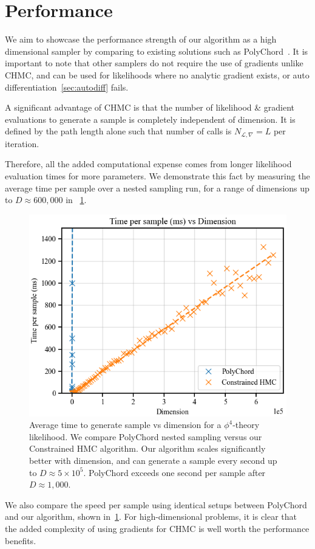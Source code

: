 \documentclass[11pt]{article}
\begin{document}
\section{Performance}\label{sec:performance}
    We aim to showcase the performance strength of our algorithm as a high dimensional sampler by comparing to existing
    solutions such as PolyChord~\cite{Handley_2015}.
    It is important to note that other samplers do not require the use of gradients unlike CHMC, and can be used for
    likelihoods where no analytic gradient exists, or auto differentiation~\eqref{sec:autodiff} fails.

    A significant advantage of CHMC is that the number of likelihood \& gradient evaluations to generate a sample is
    completely independent of dimension.
    It is defined by the path length alone such that number of calls is $N_{\mathcal{L}, \nabla} = L$ per iteration.

    Therefore, all the added computational expense comes from longer likelihood evaluation times for more parameters.
    We demonstrate this fact by measuring the average time per sample over a nested sampling run, for a range of
    dimensions up to $D \approx 600,000$ in ~\cref{fig:performance}.

    \begin{figure}[h!]
        \center
        \includegraphics[width=\linewidth]{../figures/Performance}
        \caption{
            Average time to generate sample vs dimension for a $\phi^4$-theory likelihood.
            We compare PolyChord nested sampling versus our Constrained HMC algorithm.
            Our algorithm scales significantly better with dimension, and can generate a sample every second up to
            $D \approx 5 \times 10^5$.
            PolyChord exceeds one second per sample after $D \approx 1,000$.
        }\label{fig:performance}
    \end{figure}

    We also compare the speed per sample using identical setups between PolyChord and our algorithm,
    shown in~\cref{fig:performance}.
    For high-dimensional problems, it is clear that the added complexity
    of using gradients for CHMC is well worth the performance benefits.
\end{document}
